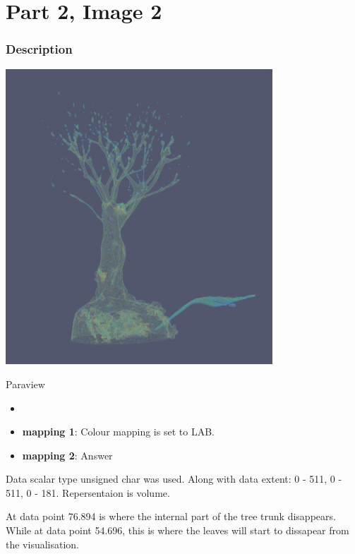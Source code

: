 \hypertarget{part-2-image-2}{%
\section{Part 2, Image 2}\label{part-1-design-3}}

\centering


\hypertarget{description}{%
	\subsubsection{Description}\label{description}}

\begin{description}
	\item[Image:]
	\item\includegraphics[width=10cm]{Tree2.png}
	\item[Tool:]
	Paraview
	\item[Visual Mappings:]
	\begin{itemize}
		\tightlist
		\item[ ]
	\end{itemize}
	\begin{itemize}
		\tightlist
		\item
		\textbf{mapping 1}: Colour mapping is set to LAB.
	\end{itemize}
	
	\begin{itemize}
		\tightlist
		\item
		\textbf{mapping 2}: Answer
	\end{itemize}
	\item[Data Preparation:] Data scalar type unsigned char was used. Along with data extent: 0 - 511, 0 - 511, 0 - 181. Repersentaion is volume.
	\item[Unique Observation:]
	At data point 76.894 is where the internal part of the tree trunk disappears. While at data point 54.696, this is where the leaves will start to dissapear from the visualisation.

\end{description}